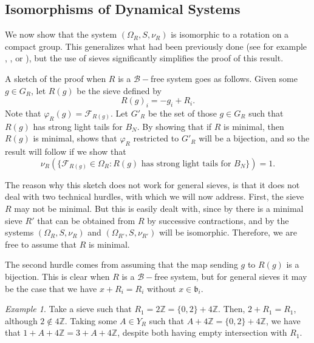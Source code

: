 \documentclass[a4paper,11pt,reqno]{amsart}
\theoremstyle{plain}
\theoremstyle{remark}
\newtheorem{example}[theorem]{Example}
\newcommand{\z}{\mathbb{Z}}
\newcommand{\cb}{\mathcal{B}}
\newcommand{\cf}{\mathcal{F}}
\newcommand{\gb}{\mathfrak{b}}
\begin{document}
			
			
			
			
			\subsection{Isomorphisms of Dynamical Systems}
			
			We now show that the system $(\Omega_{R}, S,\nu_R)$ is isomorphic to a rotation on a compact group. This generalizes what had been previously done (see for example \cite{Abdalaoui},  \cite{Bartnicka}, \cite{celarosi} or \cite{Dymek}), but the use of sieves significantly simplifies the proof of this result. 
			
			A sketch of the proof when $R$ is a $\cb-$free system goes as follows. Given some $g \in G_R$, let $R(g)$ be the sieve defined by \begin{equation}
				\label{eq:R(g)}
				R(g)_i = -g_i+R_i.
			\end{equation} Note that $\varphi_R(g) = \cf_{R(g)}$. Let $G'_R$ be the set of those $g \in G_R$ such that $R(g)$ has strong light tails for $B_N$. By showing that if $R$ is minimal, then $R(g)$ is minimal,  shows that $\varphi_R$ restricted to $G'_R$ will be a bijection, and so the result will follow if we show that
			\begin{equation}
				\label{eq: nuR of sieves with strong light tails is 1}
				\nu_R(\{\cf_{R(g)}\in \Omega_{R}: R(g) \text{ has strong light tails for }B_N \}) =1.
			\end{equation} 
			
			The reason why this sketch does not work for general sieves, is that it does not deal with two technical hurdles, with which we will now address. First, the sieve $R$ may not be minimal. But this is easily dealt with, since by  there is a minimal sieve $R'$ that can be obtained from $R$ by successive contractions, and by  the systems $(\Omega_R,S,\nu_R)$ and $(\Omega_{R'},S,\nu_{R'})$ will be isomorphic. Therefore, we are free to assume that $R$ is minimal.
			
			The second hurdle comes from assuming that the map sending $g$ to $R(g)$ is a bijection. This is clear when $R$ is a $\cb-$free system, but for general sieves it may be the case that we have $x+R_i = R_i$ without $x \in \gb_i$.
			
			\begin{example}
				Take a sieve such that $R_1 = 2\z = \{0,2\}+ 4\z$. Then, $2+R_1 = R_1$, although $2 \not \in 4\z$. Taking some $A \in Y_R$ such that $A +4\z = \{0,2\}+ 4\z$, we have that $1+A + 4\z=3+A+ 4\z$, despite both having empty intersection with $R_1$.
			\end{example} 
			
\end{document}
